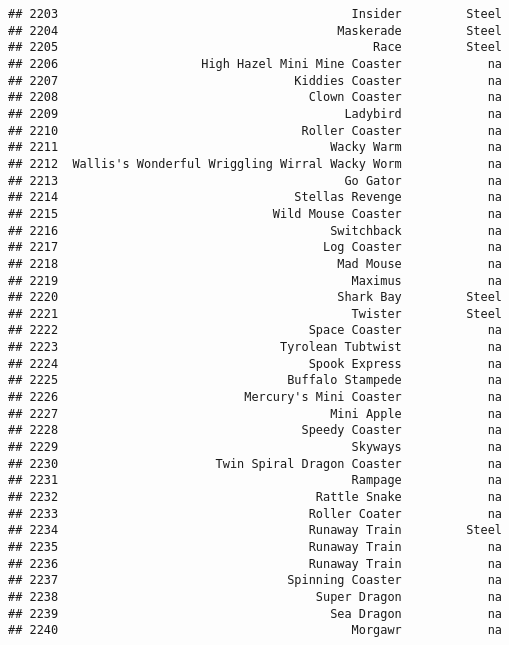 \documentclass[
]{article}
\begin{document}
\begin{verbatim}
## 2203                                         Insider         Steel
## 2204                                       Maskerade         Steel
## 2205                                            Race         Steel
## 2206                    High Hazel Mini Mine Coaster            na
## 2207                                 Kiddies Coaster            na
## 2208                                   Clown Coaster            na
## 2209                                        Ladybird            na
## 2210                                  Roller Coaster            na
## 2211                                      Wacky Warm            na
## 2212  Wallis's Wonderful Wriggling Wirral Wacky Worm            na
## 2213                                        Go Gator            na
## 2214                                 Stellas Revenge            na
## 2215                              Wild Mouse Coaster            na
## 2216                                      Switchback            na
## 2217                                     Log Coaster            na
## 2218                                       Mad Mouse            na
## 2219                                         Maximus            na
## 2220                                       Shark Bay         Steel
## 2221                                         Twister         Steel
## 2222                                   Space Coaster            na
## 2223                               Tyrolean Tubtwist            na
## 2224                                   Spook Express            na
## 2225                                Buffalo Stampede            na
## 2226                          Mercury's Mini Coaster            na
## 2227                                      Mini Apple            na
## 2228                                  Speedy Coaster            na
## 2229                                         Skyways            na
## 2230                      Twin Spiral Dragon Coaster            na
## 2231                                         Rampage            na
## 2232                                    Rattle Snake            na
## 2233                                   Roller Coater            na
## 2234                                   Runaway Train         Steel
## 2235                                   Runaway Train            na
## 2236                                   Runaway Train            na
## 2237                                Spinning Coaster            na
## 2238                                    Super Dragon            na
## 2239                                      Sea Dragon            na
## 2240                                         Morgawr            na

\end{verbatim}
\end{document}
